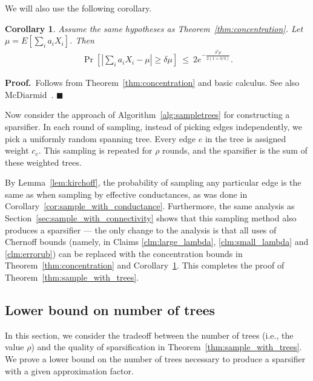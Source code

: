 \documentclass[11pt]{article}
\newcommand{\proofbelow}{8pt}
\numberwithin{equation}{section}
\newtheorem{corollary}[theorem]{Corollary}
\renewenvironment{proof}{\noindent\textbf{Proof.}\,}{\afterproof}
\newcommand{\afterproof}{\hfill $\blacksquare$ \par \vspace{\proofbelow}}
\newcommand{\Algorithm}[1]{Algorithm~\ref{alg:#1}}
\newcommand{\CorollaryName}[1]{\label{cor:#1}}
\newcommand{\Corollary}[1]{Corollary~\ref{cor:#1}}
\newcommand{\Lemma}[1]{Lemma~\ref{lem:#1}}
\newcommand{\SectionName}[1]{\label{sec:#1}}
\newcommand{\Section}[1]{Section~\ref{sec:#1}}
\newcommand{\Theorem}[1]{Theorem~\ref{thm:#1}}
\begin{document}
We will also use the following corollary.

\begin{corollary}
\CorollaryName{concentration}
Assume the same hypotheses as \Theorem{concentration}.
Let $\mu = E[ \sum_i a_i X_i ]$.
Then
\begin{align*}
\Pr[ | \sum_i a_i X_i - \mu | \geq \delta \mu ]
    ~\leq~ 2 e^{ - \frac{ \delta^2 \mu }{ 2 (1 + \delta/3) }}.
\end{align*}
\end{corollary}
\begin{proof}
Follows from \Theorem{concentration} and basic calculus.
See also McDiarmid~\cite[Theorem 2.3]{McDiarmid}.
\end{proof}

Now consider the approach of \Algorithm{sampletrees} for constructing a sparsifier.
In each round of sampling, instead of picking edges independently,
we pick a uniformly random spanning tree.
Every edge $e$ in the tree is assigned weight $c_e$.
This sampling is repeated for $\rho$ rounds,
and the sparsifier is the sum of these weighted trees.

By \Lemma{kirchoff}, the probability of sampling any particular edge is the same as
when sampling by effective conductances, as was done in \Corollary{sample_with_conductance}.
Furthermore, the same analysis as \Section{sample_with_connectivity} shows that this
sampling method also produces a sparsifier --- the only change to the analysis is that
all uses of Chernoff bounds 
(namely, in Claims \ref{clm:large_lambda}, \ref{clm:small_lambda}
and \ref{clm:errorub})
can be replaced with the concentration bounds in \Theorem{concentration}
and \Corollary{concentration}.
This completes the proof of \Theorem{sample_with_trees}.



\subsection{Lower bound on number of trees}
\SectionName{sp_tree_lb}

In this section, we consider the tradeoff between the number of trees (i.e., the value $\rho$)
and the quality of sparsification in Theorem~\ref{thm:sample_with_trees}.
We prove a lower bound on the number of trees necessary to produce a sparsifier
with a given approximation factor.
\end{document}
